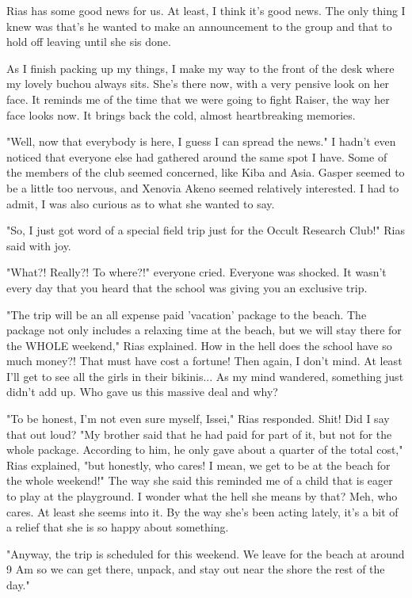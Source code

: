 \documentclass{article}
\begin{document}
Rias has some good news for us. At least, I think it's good news. The only thing I knew was that's he wanted to make an announcement to the group and that to hold off leaving until she sis done.

As I finish packing up my things, I make my way to the front of the desk where my lovely buchou always sits. She's there now, with a very pensive look on her face. It reminds me of the time that we were going to fight Raiser, the way her face looks now. It brings back the cold, almost heartbreaking memories.

"Well, now that everybody is here, I guess I can spread the news." I hadn't even noticed that everyone else had gathered around the same spot I have. Some of the members of the club seemed concerned, like Kiba and Asia. Gasper seemed to be a little too nervous, and Xenovia Akeno seemed relatively interested. I had to admit, I was also curious as to what she wanted to say.

"So, I just got word of a special field trip just for the Occult Research Club!" Rias said with joy.

"What?! Really?! To where?!" everyone cried. Everyone was shocked. It wasn't every day that you heard that the school was giving you an exclusive trip.

"The trip will be an all expense paid 'vacation' package to the beach. The package not only includes a relaxing time at the beach, but we will stay there for the WHOLE weekend," Rias explained. How in the hell does the school have so much money?! That must have cost a fortune! Then again, I don't mind. At least I'll get to see all the girls in their bikinis... As my mind wandered, something just didn't add up. Who gave us this massive deal and why?

"To be honest, I'm not even sure myself, Issei," Rias responded. Shit! Did I say that out loud? "My brother said that he had paid for part of it, but not for the whole package. According to him, he only gave about a quarter of the total cost," Rias explained, "but honestly, who cares! I mean, we get to be at the beach for the whole weekend!" The way she said this reminded me of a child that is eager to play at the playground. I wonder what the hell she means by that? Meh, who cares. At least she seems into it. By the way she's been acting lately, it's a bit of a relief that she is so happy about something.

"Anyway, the trip is scheduled for this weekend. We leave for the beach at around 9 Am so we can get there, unpack, and stay out near the shore the rest of the day."
\end{document}
